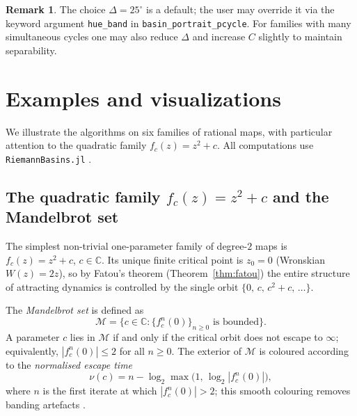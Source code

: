\documentclass[12pt]{article}
\theoremstyle{definition}
\newtheorem{remark}[theorem]{Remark}
\newcommand{\C}{\mathbb{C}}
\begin{document}
\begin{remark}
  The choice $\Delta=25^\circ$ is a default; the user may override it via the
  keyword argument \texttt{hue\_band} in \texttt{basin\_portrait\_pcycle}.
  For families with many simultaneous cycles one may also reduce
  $\Delta$ and increase $C$ slightly to maintain separability.
\end{remark}

\section{Examples and visualizations}
\label{sec:examples}

We illustrate the algorithms on six families of rational maps, with
particular attention to the quadratic family $f_c(z)=z^2+c$.  All
computations use \texttt{RiemannBasins.jl} \cite{RiemannBasins}.

\subsection{The quadratic family $f_c(z)=z^2+c$ and the Mandelbrot set}
\label{subsec:mandelbrot}

The simplest non-trivial one-parameter family of degree-$2$ maps is
$f_c(z) = z^2 + c$, $c\in\C$.  Its unique finite critical point is
$z_0=0$ (Wronskian $W(z)=2z$), so by Fatou's theorem
(Theorem~\ref{thm:fatou}) the entire structure of attracting dynamics is
controlled by the single orbit $\{0,\,c,\,c^2+c,\,\ldots\}$.

The \emph{Mandelbrot set} is defined as
\begin{equation}\label{eq:mandelbrot}
  \mathcal{M}
    = \bigl\{c\in\C : \{f_c^n(0)\}_{n\ge 0}\text{ is bounded}\bigr\}.
\end{equation}
A parameter $c$ lies in $\mathcal{M}$ if and only if the critical orbit
does not escape to $\infty$; equivalently, $|f_c^n(0)|\le 2$ for all
$n\ge 0$.  The exterior of $\mathcal{M}$ is coloured according to the
\emph{normalised escape time}
\begin{equation}\label{eq:escape_time}
  \nu(c) = n - \log_2\!\max\!\bigl(1,\,\log_2|f_c^n(0)|\bigr),
\end{equation}
where $n$ is the first iterate at which $|f_c^n(0)|>2$; this smooth
colouring removes banding artefacts \cite{Peitgen1992}.
\end{document}
